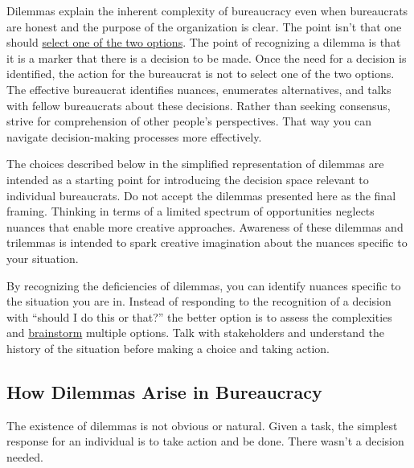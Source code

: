 Dilemmas explain the inherent complexity of bureaucracy even when bureaucrats are honest and the purpose of the organization is clear.
The point isn't that one should \href{https://en.wikipedia.org/wiki/False_dilemma}{select one of the two options}. 
\iftoggle{WPinmargin}{\marginpar{$>$Wikipedia: False\\dilemma}}{}
The point of recognizing a dilemma is that it is a marker that there is a decision to be made.
Once the need for a decision is identified, the action for the bureaucrat is not to select one of the two options. The effective bureaucrat identifies nuances, enumerates alternatives, and talks with fellow bureaucrats about these decisions. Rather than seeking consensus, strive for comprehension of other people's perspectives. That way you can navigate decision-making processes more effectively.

The choices described below in the simplified representation of dilemmas are intended as a starting point for introducing the decision space relevant to individual bureaucrats. Do not accept the dilemmas presented here as the final framing. Thinking in terms of a limited spectrum of opportunities neglects nuances that enable more creative approaches. 
Awareness of these dilemmas and trilemmas is intended to spark creative imagination about the nuances specific to your situation.

By recognizing the deficiencies of dilemmas, you can identify nuances specific to the situation you are in. Instead of responding to the recognition of a decision with ``should I do this or that?'' the better option is to assess the complexities and \href{https://en.wikipedia.org/wiki/Brainstorming}{brainstorm}
\iftoggle{WPinmargin}{\marginpar{$>$Wikipedia: Brainstorming}}{}
multiple options. Talk with stakeholders and understand the history of the situation before making a choice and taking action.



\subsection*{How Dilemmas Arise in Bureaucracy}

The existence of dilemmas is not obvious or natural. 
Given a task, the simplest response for an individual is to take action and be done. 
There wasn't a decision needed.


